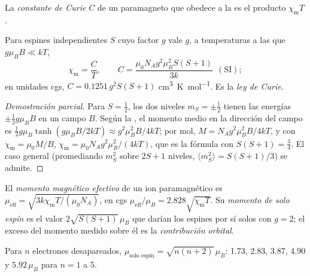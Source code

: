 \begin{definition}\label{def:b3:complex-spectra-magnetism:curie}
La \emph{constante de Curie} $C$ de un paramagneto que obedece a la
 es el producto $\chi_{\mathrm m}T$.
\end{definition}

\begin{theorem}\label{thm:b3:complex-spectra-magnetism:curie}
Para espines independientes $S$ cuyo factor $g$ vale $g$, a temperaturas a las que $g\mu_BB \ll kT$,
\[
  \chi_{\mathrm m} = \frac{C}{T}, \qquad C = \frac{\mu_0N_Ag^2\mu_B^2S(S+1)}{3k}\ \ (\text{SI});
\]
en unidades cgs, $C = 0.1251\,g^2S(S+1)$ \unit{cm^3.K.mol^{-1}}. Es la \emph{ley de Curie}.
\end{theorem}

\begin{proof}[Demostración parcial]
Para $S = \frac12$, los dos niveles $m_S = \pm\frac12$ tienen las energías $\pm\frac12g\mu_BB$ en un campo $B$. Según la
, el momento medio en la dirección del campo es $\frac12g\mu_B\tanh(g\mu_BB/2kT) \approx
g^2\mu_B^2B/4kT$; por mol, $M = N_Ag^2\mu_B^2B/4kT$, y con $\chi_{\mathrm m} = \mu_0M/B$, $\chi_{\mathrm m} = \mu_0N_Ag^2\mu_B^2/(4kT)$,
que es la fórmula con $S(S+1) = \frac34$. El caso general (promediando $m_S^2$ sobre $2S + 1$
niveles, $\langle m_S^2\rangle = S(S+1)/3$) se admite.
\end{proof}

\begin{definition}\label{def:b3:complex-spectra-magnetism:moment}
El \emph{momento magnético efectivo} de un
ion paramagnético es $\mu_{\mathrm{eff}} = \sqrt{3k\chi_{\mathrm m}T/(\mu_0N_A)}$, en cgs $\mu_{\mathrm{eff}}/\mu_B = 2.828\sqrt{\chi_{\mathrm m}T}$. Su
\emph{momento de solo espín} es el valor $2\sqrt{S(S+1)}\,\mu_B$ que darían
los espines por sí solos con $g = 2$; el exceso del momento medido sobre él es
la \emph{contribución orbital}.
\end{definition}

\begin{proposition}\label{prop:b3:complex-spectra-magnetism:spin-only}
Para $n$ electrones desapareados, $\mu_{\text{solo espín}} = \sqrt{n(n+2)}\,\mu_B$: 1.73, 2.83, 3.87, 4.90 y $5.92\,\mu_B$ para
$n = 1$ a 5.
\end{proposition}

